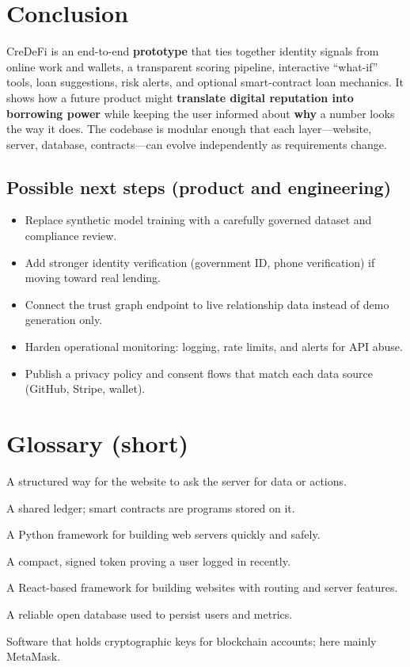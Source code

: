 \documentclass[11pt,a4paper]{article}
\begin{document}
\section{Conclusion}
CreDeFi is an end-to-end \textbf{prototype} that ties together identity signals from online work and wallets, a transparent scoring pipeline, interactive ``what-if'' tools, loan suggestions, risk alerts, and optional smart-contract loan mechanics. It shows how a future product might \textbf{translate digital reputation into borrowing power} while keeping the user informed about \textbf{why} a number looks the way it does. The codebase is modular enough that each layer---website, server, database, contracts---can evolve independently as requirements change.

\subsection{Possible next steps (product and engineering)}
\begin{itemize}[leftmargin=*]
  \item Replace synthetic model training with a carefully governed dataset and compliance review.
  \item Add stronger identity verification (government ID, phone verification) if moving toward real lending.
  \item Connect the trust graph endpoint to live relationship data instead of demo generation only.
  \item Harden operational monitoring: logging, rate limits, and alerts for API abuse.
  \item Publish a privacy policy and consent flows that match each data source (GitHub, Stripe, wallet).
\end{itemize}

\section*{Glossary (short)}
\begin{description}[style=nextline, leftmargin=*]
  \item[API] A structured way for the website to ask the server for data or actions.
  \item[Blockchain] A shared ledger; smart contracts are programs stored on it.
  \item[FastAPI] A Python framework for building web servers quickly and safely.
  \item[JWT] A compact, signed token proving a user logged in recently.
  \item[Next.js] A React-based framework for building websites with routing and server features.
  \item[PostgreSQL] A reliable open database used to persist users and metrics.
  \item[Wallet] Software that holds cryptographic keys for blockchain accounts; here mainly MetaMask.
\end{description}
\end{document}
